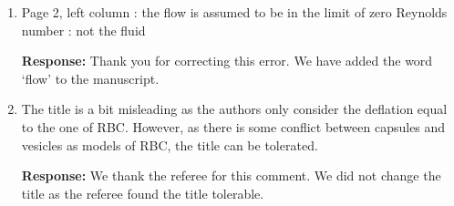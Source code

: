 \documentclass[11pt]{article}
\begin{document}
\begin{enumerate}
\item Page 2, left column : the flow is assumed to be in the limit of
  zero Reynolds number : not the fluid

\noindent
{\bf Response:} Thank you for correcting this error. We have added the
word `flow' to the manuscript.

\item The title is a bit misleading as the authors only consider the
  deflation equal to the one of RBC. However, as there is some conflict
  between capsules and vesicles as models of RBC, the title can be
  tolerated.

\noindent
{\bf Response:} We thank the referee for this comment. We did not change the title as the referee found the title tolerable.
\end{enumerate}
\end{document}
